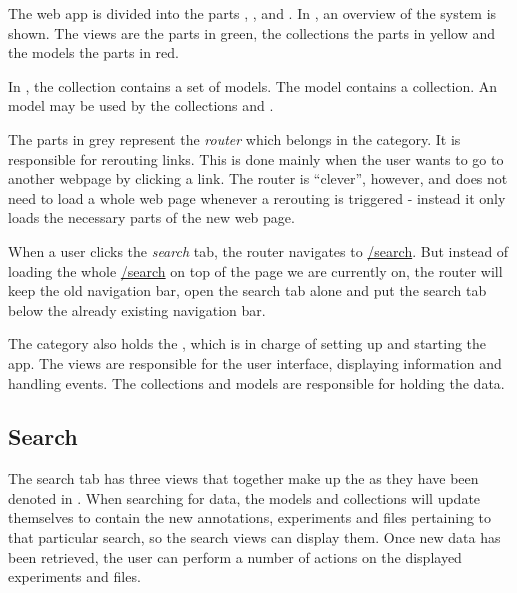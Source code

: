 The web app is divided into the parts , ,  and . In , an overview of the system is shown. The views are the parts in green, the collections the parts in yellow and the models the parts in red. 

\begin{example}
In , the collection  contains a set of  models. The model  contains a  collection. An  model may be used by the collections  and .
\end{example}

The parts in grey represent the \textit{router} which belongs in the  category. It is responsible for rerouting links. This is done mainly when the user wants to go to another webpage by clicking a link. The router is ``clever'', however, and does not need to load a whole web page whenever a rerouting is triggered - instead it only loads the necessary parts of the new web page.

\begin{example}
When a user clicks the \textit{search} tab, the router navigates to \url{/search}. But instead of loading the whole \url{/search} on top of the page we are currently on, the router will keep the old navigation bar, open the search tab alone and put the search tab below the already existing navigation bar.
\end{example}

The  category also holds the , which is in charge of setting up and starting the app. The views are responsible for the user interface, displaying information and handling events. The collections and models are responsible for holding the data.

\label{sec:web_search}
\subsection{Search}
The search tab has three views that together make up the  as they have been denoted in . When searching for data, the models and collections will update themselves to contain the new annotations, experiments and files pertaining to that particular search, so the search views can display them. Once new data has been retrieved, the user can perform a number of actions on the displayed experiments and files. 

